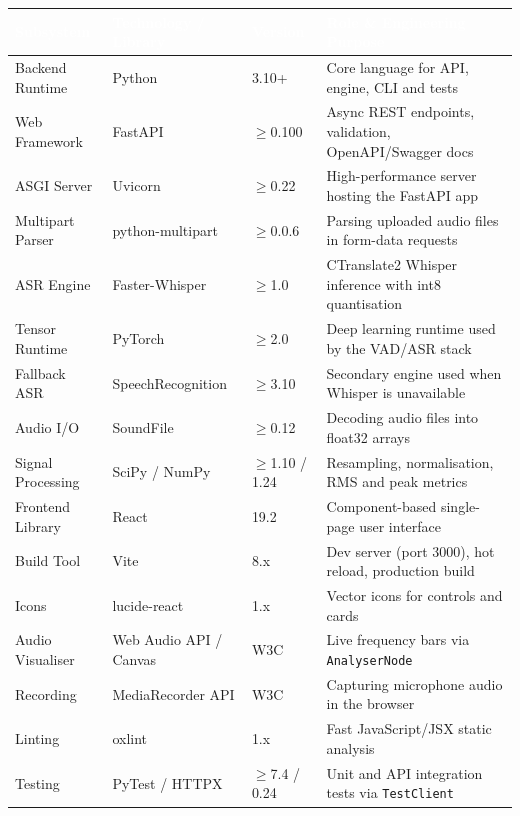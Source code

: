 \documentclass[11pt,a4paper]{article}
\newcommand{\thc}[1]{\textcolor{white}{\bfseries #1}}
\newcommand{\headrow}{\rowcolor{headblue}}
\begin{document}
\begin{tabularx}{\textwidth}{|L{2.9cm}|L{3.4cm}|L{1.7cm}|Y|}
\hline
\headrow \thc{Subsystem} & \thc{Technology / Library} & \thc{Version} & \thc{Role \& Engineering Purpose} \\ \hline
Backend Runtime & Python & 3.10+ & Core language for API, engine, CLI and tests \\ \hline
Web Framework & FastAPI & $\geq$0.100 & Async REST endpoints, validation, OpenAPI/Swagger docs \\ \hline
ASGI Server & Uvicorn & $\geq$0.22 & High-performance server hosting the FastAPI app \\ \hline
Multipart Parser & python-multipart & $\geq$0.0.6 & Parsing uploaded audio files in form-data requests \\ \hline
ASR Engine & Faster-Whisper & $\geq$1.0 & CTranslate2 Whisper inference with int8 quantisation \\ \hline
Tensor Runtime & PyTorch & $\geq$2.0 & Deep learning runtime used by the VAD/ASR stack \\ \hline
Fallback ASR & SpeechRecognition & $\geq$3.10 & Secondary engine used when Whisper is unavailable \\ \hline
Audio I/O & SoundFile & $\geq$0.12 & Decoding audio files into float32 arrays \\ \hline
Signal Processing & SciPy / NumPy & $\geq$1.10 / 1.24 & Resampling, normalisation, RMS and peak metrics \\ \hline
Frontend Library & React & 19.2 & Component-based single-page user interface \\ \hline
Build Tool & Vite & 8.x & Dev server (port 3000), hot reload, production build \\ \hline
Icons & lucide-react & 1.x & Vector icons for controls and cards \\ \hline
Audio Visualiser & Web Audio API / Canvas & W3C & Live frequency bars via \texttt{AnalyserNode} \\ \hline
Recording & MediaRecorder API & W3C & Capturing microphone audio in the browser \\ \hline
Linting & oxlint & 1.x & Fast JavaScript/JSX static analysis \\ \hline
Testing & PyTest / HTTPX & $\geq$7.4 / 0.24 & Unit and API integration tests via \texttt{TestClient} \\ \hline
\end{tabularx}
\end{document}
